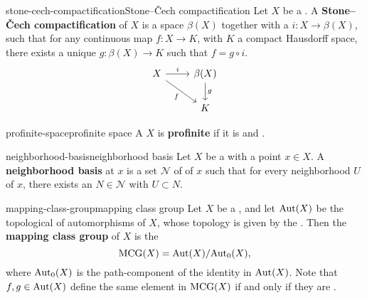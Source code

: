 \begin{topic}{stone-cech-compactification}{Stone--Čech compactification}
    Let $X$ be a . A \textbf{Stone--Čech compactification} of $X$ is a   space $\beta(X)$ together with a  $i \colon X \to \beta(X)$, such that for any continuous map $f \colon X \to K$, with $K$ a compact Hausdorff space, there exists a unique $g \colon \beta(X) \to K$ such that $f = g \circ i$.
    \[ \svg \begin{tikzcd} X \arrow{r}{i} \arrow[swap]{dr}{f} & \beta(X) \arrow{d}{g} \\ & K \end{tikzcd} \]
\end{topic}

\begin{topic}{profinite-space}{profinite space}
    A  $X$ is \textbf{profinite} if it is   and .
\end{topic}

\begin{topic}{neighborhood-basis}{neighborhood basis}
    Let $X$ be a  with a point $x \in X$. A \textbf{neighborhood basis} at $x$ is a set $\mathcal{N}$ of  of $x$ such that for every neighborhood $U$ of $x$, there exists an $N \in \mathcal{N}$ with $U \subset N$.
\end{topic}

\begin{topic}{mapping-class-group}{mapping class group}
    Let $X$ be a , and let $\textup{Aut}(X)$ be the topological  of automorphisms of $X$, whose topology is given by the . Then the \textbf{mapping class group} of $X$ is the 
    \[ \textup{MCG}(X) = \textup{Aut}(X) / \textup{Aut}_0(X) , \]
    where $\textup{Aut}_0(X)$ is the path-component of the identity in $\textup{Aut}(X)$. Note that $f, g \in \textup{Aut}(X)$ define the same element in $\textup{MCG}(X)$ if and only if they are .
\end{topic}

